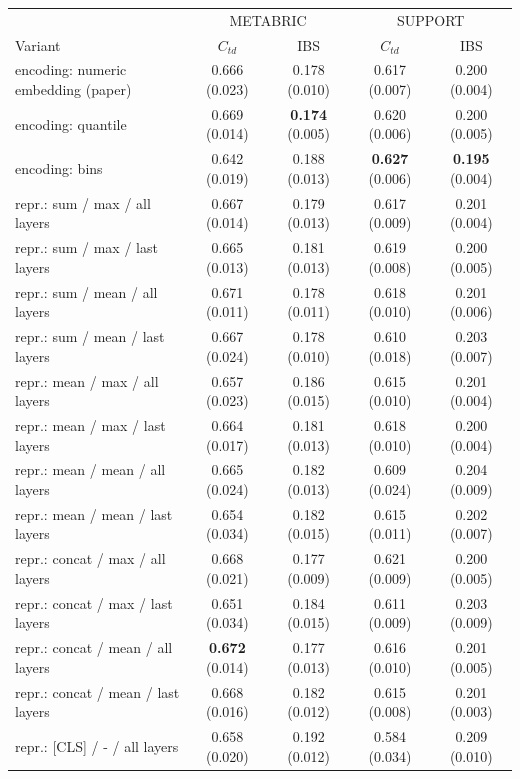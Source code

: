 \begin{tabular}{lcccc}
\toprule
 & \multicolumn{2}{c}{METABRIC} & \multicolumn{2}{c}{SUPPORT} \\
Variant & $C_{td}$ & IBS & $C_{td}$ & IBS \\
\midrule
encoding: numeric embedding (paper) & 0.666 (0.023) & 0.178 (0.010) & 0.617 (0.007) & 0.200 (0.004) \\
encoding: quantile & 0.669 (0.014) & \textbf{0.174} (0.005) & 0.620 (0.006) & 0.200 (0.005) \\
encoding: bins & 0.642 (0.019) & 0.188 (0.013) & \textbf{0.627} (0.006) & \textbf{0.195} (0.004) \\
repr.: sum / max / all layers & 0.667 (0.014) & 0.179 (0.013) & 0.617 (0.009) & 0.201 (0.004) \\
repr.: sum / max / last layers & 0.665 (0.013) & 0.181 (0.013) & 0.619 (0.008) & 0.200 (0.005) \\
repr.: sum / mean / all layers & 0.671 (0.011) & 0.178 (0.011) & 0.618 (0.010) & 0.201 (0.006) \\
repr.: sum / mean / last layers & 0.667 (0.024) & 0.178 (0.010) & 0.610 (0.018) & 0.203 (0.007) \\
repr.: mean / max / all layers & 0.657 (0.023) & 0.186 (0.015) & 0.615 (0.010) & 0.201 (0.004) \\
repr.: mean / max / last layers & 0.664 (0.017) & 0.181 (0.013) & 0.618 (0.010) & 0.200 (0.004) \\
repr.: mean / mean / all layers & 0.665 (0.024) & 0.182 (0.013) & 0.609 (0.024) & 0.204 (0.009) \\
repr.: mean / mean / last layers & 0.654 (0.034) & 0.182 (0.015) & 0.615 (0.011) & 0.202 (0.007) \\
repr.: concat / max / all layers & 0.668 (0.021) & 0.177 (0.009) & 0.621 (0.009) & 0.200 (0.005) \\
repr.: concat / max / last layers & 0.651 (0.034) & 0.184 (0.015) & 0.611 (0.009) & 0.203 (0.009) \\
repr.: concat / mean / all layers & \textbf{0.672} (0.014) & 0.177 (0.013) & 0.616 (0.010) & 0.201 (0.005) \\
repr.: concat / mean / last layers & 0.668 (0.016) & 0.182 (0.012) & 0.615 (0.008) & 0.201 (0.003) \\
repr.: [CLS] / - / all layers & 0.658 (0.020) & 0.192 (0.012) & 0.584 (0.034) & 0.209 (0.010) \\
\bottomrule
\end{tabular}
